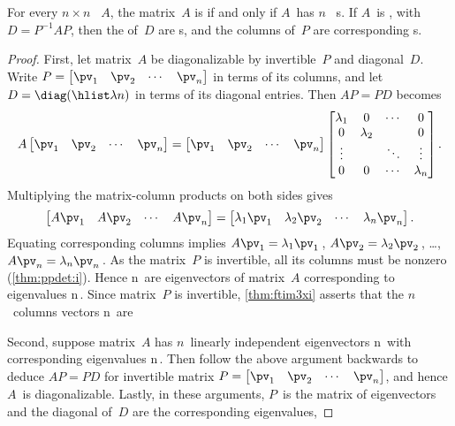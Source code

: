 \begin{theorem} \label{thm:gendiag} 
For every \(n\times n\) ~\(A\), the matrix~\(A\) is  if and only if \(A\)~has \(n\)~ s.  
If \(A\)~is , with  \(D=P^{-1}AP\), then  the  of~\(D\) are s, and the columns of~\(P\) are corresponding s.
\end{theorem}
\begin{proof} 
First, let matrix~\(A\) be diagonalizable by invertible~\(P\) and diagonal~\(D\).
Write \(P=\begin{bmatrix} \pv_1&\pv_2&\cdots&\pv_n \end{bmatrix}\) in terms of its columns, and let \(D=\diag(\hlist\lambda n)\) in terms of its diagonal entries.
Then \(AP=PD\) becomes
\begin{equation*}
A\begin{bmatrix} \pv_1&\pv_2&\cdots&\pv_n \end{bmatrix}
=\begin{bmatrix} \pv_1&\pv_2&\cdots&\pv_n \end{bmatrix}
\begin{bmatrix} \lambda_1&0&\cdots&0\\
0&\lambda_2&&0\\
\vdots&&\ddots&\vdots\\
0&0&\cdots&\lambda_n \end{bmatrix}.
\end{equation*}
Multiplying the matrix-column products on both sides gives
\begin{equation*}
\begin{bmatrix} A\pv_1&A\pv_2&\cdots&A\pv_n \end{bmatrix}
=\begin{bmatrix} \lambda_1\pv_1& \lambda_2\pv_2&\cdots& \lambda_n\pv_n \end{bmatrix}.
\end{equation*}
Equating corresponding columns implies \(A\pv_1=\lambda_1\pv_1\)\,, \(A\pv_2=\lambda_2\pv_2\)\,, \ldots, \(A\pv_n=\lambda_n\pv_n\)\,.
As the matrix~\(P\) is invertible, all its columns must be nonzero (\cref{thm:ppdet:i}).
Hence \hlist\pv n\ are eigenvectors of matrix~\(A\) corresponding to eigenvalues \hlist\lambda n\,.
Since matrix~\(P\) is invertible, \cref{thm:ftim3xi} asserts that the \(n\)~columns vectors \hlist\pv n\ are 

Second, suppose matrix~\(A\) has \(n\)~{linearly independent} {eigenvector}s \hlist\pv n\ with corresponding eigenvalues \hlist\lambda n\,.  
Then follow the above argument backwards to deduce \(AP=PD\) for invertible matrix \(P=\begin{bmatrix} \pv_1&\pv_2&\cdots&\pv_n \end{bmatrix}\), and hence \(A\)~is diagonalizable.
Lastly, in these arguments, \(P\)~is the matrix of eigenvectors and the diagonal of~\(D\) are the corresponding eigenvalues, 
\end{proof}


